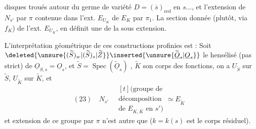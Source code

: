 disques troués autour du germe de
variété $D=(\overline s)_{\mathrm{red}}$ en $s\dots$, et l'extension
de $N_{s'}$ par $\pi$ contenue dans l'ext. $E_{U_K}$ de
$E_K$ par $\pi_1$.
La section donnée (plutôt,
 via $f_K$) de l'ext. $E_{U_K}$, en
définit une de la sous extension. 

L'interprétation géométrique de ces constructions
profinies est   : Soit
$\deleted{\unsure{(\widetilde S)_w|(\widetilde S)_s|\widetilde Z}}\inserted{\unsure{\widetilde{\underline O}_s|\underline O_s}}$ le hensélisé (pas strict) de $\underline O_{S,s}=\underline O_s$,
et $\widetilde S=\operatorname{Spec}(\widetilde{\underline O}_s)$ , $\widetilde K$ son corps des
fonctions, on a $U_{\widetilde S}$ sur $\widetilde S$, $U_{\widetilde K}$ sur $\widetilde K$,
et 
\[
(23)\quad N_{s'}\quad
\begin{gathered}[t]
\text{(groupe de}\\
\text{décomposition}\\
\text{de }E_{K,\overline K}\text{ en }s')
\end{gathered}
\simeq E_{\widetilde K}
\]
et   extension de ce groupe par $\pi$
n'est autre que
($k=k(s)$ est le corps résiduel).


